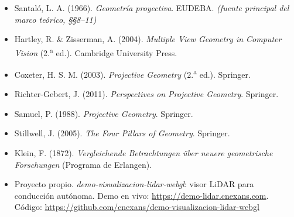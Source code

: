 \documentclass[11pt,a4paper]{article}
\begin{document}
\begin{itemize}[leftmargin=1.4em,itemsep=3pt]
\item Santaló, L. A. (1966). \textit{Geometría proyectiva}. EUDEBA.
  \hfill\textit{(fuente principal del marco teórico, §§8--11)}
\item Hartley, R. \& Zisserman, A. (2004). \textit{Multiple View
  Geometry in Computer Vision} (2.\textsuperscript{a} ed.). Cambridge
  University Press.
\item Coxeter, H. S. M. (2003). \textit{Projective Geometry}
  (2.\textsuperscript{a} ed.). Springer.
\item Richter-Gebert, J. (2011). \textit{Perspectives on Projective
  Geometry}. Springer.
\item Samuel, P. (1988). \textit{Projective Geometry}. Springer.
\item Stillwell, J. (2005). \textit{The Four Pillars of Geometry}.
  Springer.
\item Klein, F. (1872). \textit{Vergleichende Betrachtungen über neuere
  geometrische Forschungen} (Programa de Erlangen).
\item Proyecto propio. \emph{demo-visualizacion-lidar-webgl}: visor LiDAR
  para conducción autónoma. Demo en vivo:
  \url{https://demo-lidar.cnexans.com}. Código:
  \url{https://github.com/cnexans/demo-visualizacion-lidar-webgl}
\end{itemize}
\end{document}
